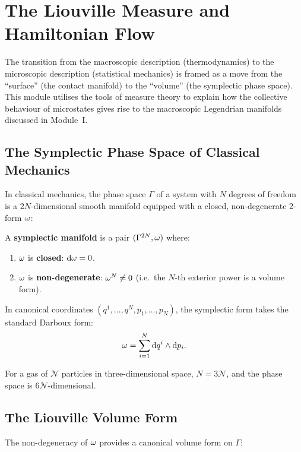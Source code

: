 \chapter{The Liouville Measure and Hamiltonian Flow}

The transition from the macroscopic description (thermodynamics) to the microscopic description (statistical mechanics) is framed as a move from the ``surface'' (the contact manifold) to the ``volume'' (the symplectic phase space). This module utilises the tools of measure theory to explain how the collective behaviour of microstates gives rise to the macroscopic Legendrian manifolds discussed in Module~I.

\section{The Symplectic Phase Space of Classical Mechanics}

In classical mechanics, the phase space $\Gamma$ of a system with $N$ degrees of freedom is a $2N$-dimensional smooth manifold equipped with a closed, non-degenerate 2-form $\omega$:

\begin{definition}
A \textbf{symplectic manifold} is a pair $(\Gamma^{2N}, \omega)$ where:
\begin{enumerate}
\item $\omega$ is \textbf{closed}: $\dd\omega = 0$.
\item $\omega$ is \textbf{non-degenerate}: $\omega^N \neq 0$ (i.e.\ the $N$-th exterior power is a volume form).
\end{enumerate}
\end{definition}

In canonical coordinates $(q^1, \ldots, q^N, p_1, \ldots, p_N)$, the symplectic form takes the standard Darboux form:
\begin{equation}
\omega = \sum_{i=1}^{N} \dd q^i \wedge \dd p_i.
\end{equation}

For a gas of $\mathcal{N}$ particles in three-dimensional space, $N = 3\mathcal{N}$, and the phase space is $6\mathcal{N}$-dimensional.

\section{The Liouville Volume Form}

The non-degeneracy of $\omega$ provides a canonical volume form on $\Gamma$:

